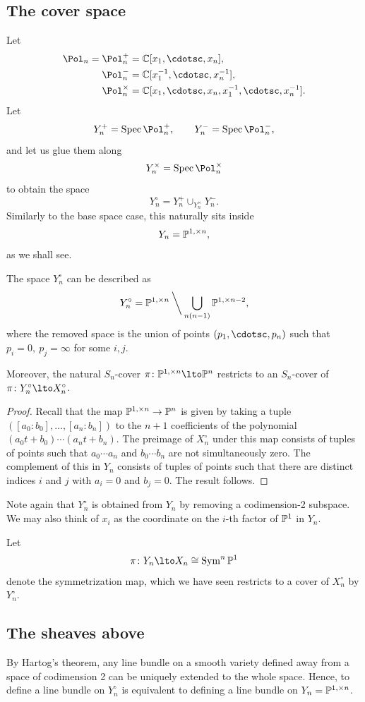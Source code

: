 \documentclass[11pt,reqno]{amsart}
\begin{document}
\subsection{The cover space}
Let 
\begin{align*}
    \Pol_n=\Pol^+_n&=\BC[x_1,\cdotsc,x_n],\\
    \Pol_n^-&=\BC[x_1^{-1},\cdotsc,x_n^{-1}],\\
    \Pol_n^\times&=\BC[x_1,\cdotsc,x_n,x_1^{-1},\cdotsc,x_n^{-1}].
\end{align*}
Let
\[Y_n^+=\Spec\Pol_n^+,\qquad Y_n^-=\Spec\Pol_n^-,\] 
and let us glue them along 
\[Y_n^\times=\Spec\Pol_n^\times\]
to obtain the space
\[Y_n^\circ =Y_n^+\cup_{Y_n^\times} Y_n^-.\] 
Similarly to the base space case, this naturally sits inside 
\[Y_n=\mathbb P^{1,\times n},\] 
as we shall see.
\begin{proposition}
    The space $ Y_n^\circ$ can be described as
    \[ Y_n^\circ=\mathbb P^{1,\times n}\mathbin{\bigg\backslash}\bigcup_{n(n-1)} \mathbb P^{1,\times n-2},\] 
    where the removed space is the union of points $(p_1,\cdotsc,p_n)$ such that $p_i=0,\ p_j=\infty$ for some $i,j$.

    Moreover, the natural $S_n$-cover $\pi\colon \BP^{1,\times n}\lto\BP^n$ restricts to an $S_n$-cover of $\pi\colon  Y_n^\circ \lto  X_n^\circ$.
\end{proposition}
\begin{proof}
    Recall that the map $\mathbb P^{1,\times n}\to\mathbb P^n$ is given by taking a tuple $([a_0\colon b_0],\ldots, [a_n\colon b_n])$ to the $n+1$ coefficients of the polynomial $(a_0t+b_0)\cdots(a_nt+b_n)$. The preimage of $ X_n^\circ$ under this map consists of tuples of points such that $a_0\cdots a_n$ and $b_0\cdots b_n$ are not simultaneously zero. The complement of this in $Y_n$ consists of tuples of points such that there are distinct indices $i$ and $j$ with $a_i=0$ and $b_j=0$. The result follows.
\end{proof}
Note again that $Y_n^\circ$ is obtained from $Y_n$ by removing a codimension-2 subspace. We may also think of $x_i$ as the coordinate on the $i$-th factor of $\mathbb P^1$ in $Y_n$. 

Let
\[\pi\colon Y_n\lto X_n\cong \Sym^n\BP^1 \] 
denote the symmetrization map, which we have seen restricts to a cover of $X_n^\circ$ by $Y_n^\circ$. 

\subsection{The sheaves above}
By Hartog's theorem, any line bundle on a smooth variety defined away from a space of codimension 2 can be uniquely extended to the whole space. Hence, to define a line bundle on $Y_n^\circ$ is equivalent to defining a line bundle on $Y_n=\mathbb P^{1,\times n}$. 
\end{document}
